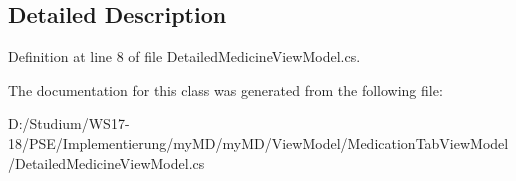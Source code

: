 \subsection{Detailed Description}




Definition at line 8 of file Detailed\-Medicine\-View\-Model.cs.

The documentation for this class was generated from the following file:\begin{CompactItemize}
\item 
D:/Studium/WS17-18/PSE/Implementierung/my\-MD/my\-MD/View\-Model/Medication\-Tab\-View\-Model/Detailed\-Medicine\-View\-Model.cs\end{CompactItemize}
